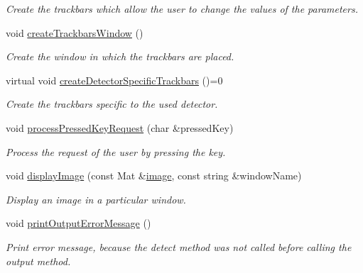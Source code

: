 \begin{DoxyCompactItemize}
\begin{DoxyCompactList}\small\item\em \-Create the trackbars which allow the user to change the values of the parameters. \end{DoxyCompactList}\item 
void \hyperlink{classmultiscale_1_1analysis_1_1Detector_afdf4c74184888dbd112d0f1cec3776cd}{create\-Trackbars\-Window} ()
\begin{DoxyCompactList}\small\item\em \-Create the window in which the trackbars are placed. \end{DoxyCompactList}\item 
virtual void \hyperlink{classmultiscale_1_1analysis_1_1Detector_a930ad07f5b8d9f21e6758341f71ae31a}{create\-Detector\-Specific\-Trackbars} ()=0
\begin{DoxyCompactList}\small\item\em \-Create the trackbars specific to the used detector. \end{DoxyCompactList}\item 
void \hyperlink{classmultiscale_1_1analysis_1_1Detector_a72265d36d3fa22aa3c141eb4001fe2fe}{process\-Pressed\-Key\-Request} (char \&pressed\-Key)
\begin{DoxyCompactList}\small\item\em \-Process the request of the user by pressing the key. \end{DoxyCompactList}\item 
void \hyperlink{classmultiscale_1_1analysis_1_1Detector_ae68f8f87cc1e4e1cd22cee1e3604ef4b}{display\-Image} (const \-Mat \&\hyperlink{classmultiscale_1_1analysis_1_1Detector_a523830a6cfe409694ce8327c3c736fbd}{image}, const string \&window\-Name)
\begin{DoxyCompactList}\small\item\em \-Display an image in a particular window. \end{DoxyCompactList}\item 
void \hyperlink{classmultiscale_1_1analysis_1_1Detector_a9150f3fc7945405da34761a4250b7c79}{print\-Output\-Error\-Message} ()
\begin{DoxyCompactList}\small\item\em \-Print error message, because the detect method was not called before calling the output method. \end{DoxyCompactList}\end{DoxyCompactItemize}
